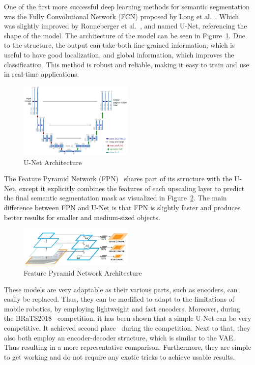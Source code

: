 One of the first more successful deep learning methods for semantic segmentation was the Fully Convolutional Network (FCN) proposed by Long et al.~\cite{long2015fully}. Which was slightly improved by Ronneberger et al.~\cite{ronneberger2015u}, and named U-Net, referencing the shape of the model. The architecture of the model can be seen in Figure~\ref{fig:unet-architecture}. Due to the structure, the output can take both fine-grained information, which is useful to have good localization, and global information, which improves the classification. This method is robust and reliable, making it easy to train and use in real-time applications.
\begin{figure}[ht]
    \centering
    \includegraphics[width=0.5\textwidth]{figures/unet-architecture.png}
    \caption{U-Net Architecture~\cite{ronneberger2015u}}
    \label{fig:unet-architecture}
\end{figure}

The Feature Pyramid Network (FPN)~\cite{lin2017feature} shares part of its structure with the U-Net, except it explicitly combines the features of each upscaling layer to predict the final semantic segmentation mask as visualized in Figure~\ref{fig:fpn-architecture}. The main difference between FPN and U-Net is that FPN is slightly faster and produces better results for smaller and medium-sized objects.

\begin{figure}[ht]
    \centering
    \includegraphics[width=0.5\textwidth]{figures/fpn-architecture.png}
    \caption{Feature Pyramid Network Architecture~\cite{lin2017feature}}
    \label{fig:fpn-architecture}
\end{figure}

These models are very adaptable as their various parts, such as encoders, can easily be replaced. Thus, they can be modified to adapt to the limitations of mobile robotics, by employing lightweight and fast encoders. Moreover, during the BRaTS2018~\cite{menze2014multimodal} competition, it has been shown that a simple U-Net can be very competitive. It achieved second place~\cite{DBLP:journals/corr/abs-1809-10483} during the competition. Next to that, they also both employ an encoder-decoder structure, which is similar to the VAE. Thus resulting in a more representative comparison. Furthermore, they are simple to get working and do not require any exotic tricks to achieve usable results.
